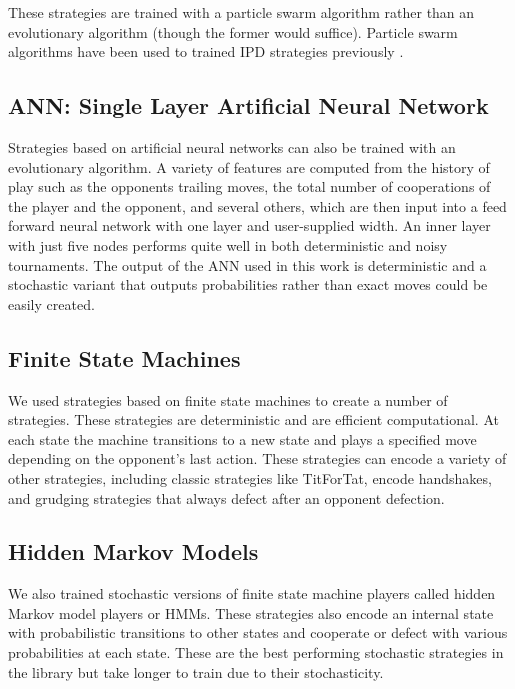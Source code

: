 \documentclass{article}
\begin{document}
These strategies are trained with a particle swarm algorithm rather than an
evolutionary algorithm (though the former would suffice). Particle swarm
algorithms have been used to trained IPD strategies previously
\cite{franken2005particle}.


\subsection{ANN: Single Layer Artificial Neural Network}

Strategies based on artificial neural networks can also be trained with an
evolutionary algorithm. A variety of features are computed from the history
of play such as the opponents trailing moves, the total number of cooperations
of the player and the opponent, and several others, which are then input
into a feed forward neural network with one layer and user-supplied width.
An inner layer with just five nodes performs quite well in both deterministic and
noisy tournaments. The output of the ANN used in this work is deterministic and
a stochastic variant that outputs probabilities rather than exact moves could
be easily created.


\subsection{Finite State Machines}

We used strategies based on finite state machines to create a number of
strategies. These strategies are deterministic and are efficient computational.
At each state the machine transitions to a new state and plays a specified move
depending on the opponent's last action. These strategies can encode a variety
of other strategies, including classic strategies like TitForTat, encode
handshakes, and grudging strategies that always defect after an opponent
defection.


\subsection{Hidden Markov Models}

We also trained stochastic versions of finite state machine players called
hidden Markov model players or HMMs. These strategies also encode an internal
state with probabilistic transitions to other states and cooperate or defect
with various probabilities at each state. These are the best performing
stochastic strategies in the library but take longer to train due to their
stochasticity.
\end{document}
